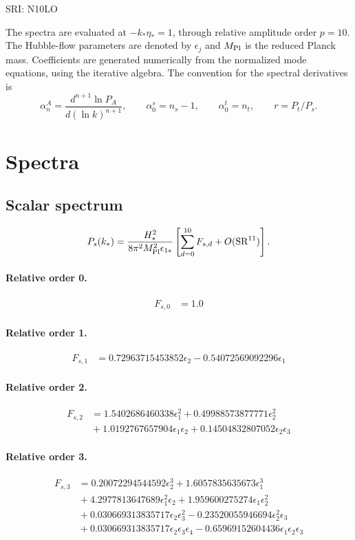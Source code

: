 \documentclass[10pt]{article}
\begin{document}
\begin{center}\Large SRI: N10LO\end{center}
The spectra are evaluated at $-k_*\eta_*=1$, through relative amplitude
order $p=10$. The Hubble-flow parameters are denoted by $\epsilon_j$
and $M_{\rm Pl}$ is the reduced Planck mass. Coefficients are generated
numerically from the normalized mode equations, using the iterative algebra.
The convention for the spectral derivatives is
\[
\alpha_n^A=\frac{d^{n+1}\ln P_A}{d(\ln k)^{n+1}},\qquad
\alpha_0^s=n_s-1,\qquad\alpha_0^t=n_t,\qquad r=P_t/P_s.
\]
\section{Spectra}

\subsection{Scalar spectrum}
\[P_s(k_*)=\frac{H_*^2}{8\pi^2M_{\rm Pl}^2\epsilon_{1*}}\left[\sum_{d=0}^{10}F_{s,d}+O(\mathrm{SR}^{11})\right].\]
\paragraph{Relative order 0.}
\begin{align*}
F_{s,0} &= 1.0
\end{align*}

\paragraph{Relative order 1.}
\begin{align*}
F_{s,1} &= 0.72963715453852 \epsilon_{2} - 0.54072569092296 \epsilon_{1}
\end{align*}

\paragraph{Relative order 2.}
\begin{align*}
F_{s,2} &= 1.5402686460338 \epsilon_{1}^{2} + 0.49988573877771 \epsilon_{2}^{2} \\
&{}  + 1.0192767657904 \epsilon_{1} \epsilon_{2} + 0.14504832807052 \epsilon_{2} \epsilon_{3}
\end{align*}

\paragraph{Relative order 3.}
\begin{align*}
F_{s,3} &= 0.20072294544592 \epsilon_{2}^{3} + 1.6057835635673 \epsilon_{1}^{3} \\
&{}  + 4.2977813647689 \epsilon_{1}^{2} \epsilon_{2} + 1.959600275274 \epsilon_{1} \epsilon_{2}^{2} \\
&{}  + 0.030669313835717 \epsilon_{2} \epsilon_{3}^{2} - 0.23520055946694 \epsilon_{2}^{2} \epsilon_{3} \\
&{}  + 0.030669313835717 \epsilon_{2} \epsilon_{3} \epsilon_{4} - 0.65969152604436 \epsilon_{1} \epsilon_{2} \epsilon_{3}
\end{align*}
\end{document}
